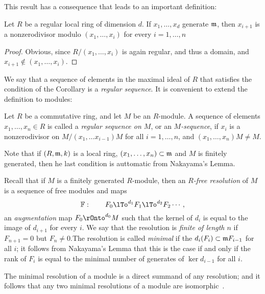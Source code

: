 This result has a consequence that leads to an important definition:

\begin{corollary}
 Let $R$ be a regular local ring of dimension $d$. If $x_{1}, \dots, x_{d}$  generate $\gm$, then 
 $x_{i+1}$ is a nonzerodivisor modulo $(x_{1}, \dots, x_{i})$ for every $i = 1,\dots, n$
\end{corollary}
\begin{proof}
 Obvious, since $R/(x_{1},\dots, x_{i})$ is again regular, and thus a domain, and $x_{i+1}\notin (x_{1},\dots,x_{i})$.
\end{proof}

We say that a sequence of elements in the maximal ideal of $R$ that satisfies the condition of the Corollary is a \emph{regular sequence}. It is convenient to extend
the definition to modules:

\begin{definition}
 Let $R$ be a commutative ring, and let $M$ be an $R$-module. A sequence of
 elements $x_{1}, \dots, x_{n}\in R$ is called a \emph{regular sequence on $M$}, or an
 \emph{$M$-sequence}, if
 $x_{i}$ is a nonzerodivisor on $M/(x_{1}, \dots x_{i-1})M$  for all $i= 1,\dots, n$, and 
 $(x_{1}, \dots, x_{n})M \neq M$.
\end{definition}

Note that if $(R,\gm,k)$ is a local ring, $(x_{1},\dots,x_{n})\subset \gm$ and $M$ is finitely generated, then he last condition is auttomatic from Nakayama's Lemma.

 Recall
that if $M$ is a finitely generated $R$-module, then an \emph{$R$-free resolution} of $M$ is a sequence of free modules and maps
$$
\FF:\qquad F_{0} \lTo^{d_{1}} F_{1}\lTo^{d_{2}} F_{2}\cdots,
$$
an \emph{augmentation} map $F_{0} \rOnto^{d_{0}} M$ such that the kernel of $d_{i}$ is equal to the image of $d_{i+1}$ for every $i$. We say that the resolution is \emph{finite of length $n$} if $F_{n+1}= 0$ but $F_{n}\neq 0$.The resolution is called \emph{minimal} if the $d_{i}(F_{i}) \subset \gm F_{i-1}$ for all $i$; it follows from Nakayama's Lemma that this is the case if and only if the rank of $F_{i}$ is equal to the minimal
number of generates of $\ker d_{i-1}$ for all $i$. 

The minimal resolution of a module is a direct summand of any resolution; and it follows that any two minimal resolutions of a module are isomorphic~\cite[Theorem ***]{E}. 

